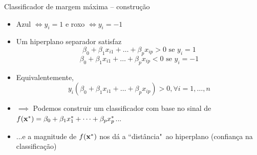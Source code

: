 

\begin{frame}{Classificador de margem máxima -- construção}
    \begin{itemize}
        \item Azul  $\iff y_i = 1$ e roxo $\iff y_i = -1$
        
        \pause
        
        \item Um hiperplano separador satisfaz $$\beta_0 + \beta_1 x_{i1} + \dots + \beta_p x_{ip} > 0 \text{ se } y_i = 1$$
        $$\beta_0 + \beta_1 x_{i1} + \dots + \beta_p x_{ip} < 0 \text{ se } y_i = -1$$
        
        \pause
        
        \item Equivalentemente, $$y_i(\beta_0 + \beta_1 x_{i1} + \dots + \beta_p x_{ip}) > 0, \forall i = 1, \dots, n$$
        
        \pause
        
        \item $\implies$ Podemos construir um classificador com base no \alert{sinal} de $f({\bf x}^*) = \beta_0 + \beta_1 x_1^* + \dots + \beta_p x_p^*$...
        
        \pause
        
        \item ...e a \alert{magnitude} de $f({\bf x}^*)$ nos dá a ``distância"~ao hiperplano (confiança na classificação)
    \end{itemize}
\end{frame}



